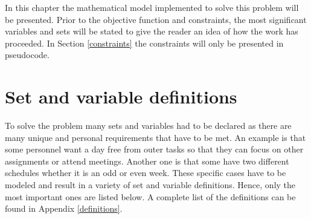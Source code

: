 In this chapter the mathematical model implemented to solve this problem will be presented. Prior to the objective function and constraints, the most significant variables and sets will be stated to give the reader an idea of how the work has proceeded. In Section \ref{constraints} the constraints will only be presented in pseudocode. %
\section{Set and variable definitions} \label{variables}
To solve the problem many sets and variables had to be declared as there are many unique and personal requirements that have to be met. An example is that some personnel want a day free from outer tasks so that they can focus on other assignments or attend meetings. Another one is that some have two different schedules whether it is an odd or even week. These specific cases have to be modeled and result in a variety of set and variable definitions. Hence, only the most important ones are listed below. A complete list of the definitions can be found in Appendix \ref{definitions}. \\
 \\
  \\
	 	\\
                                                                \\
                                                       \\
                                                   \\
                                                \\

